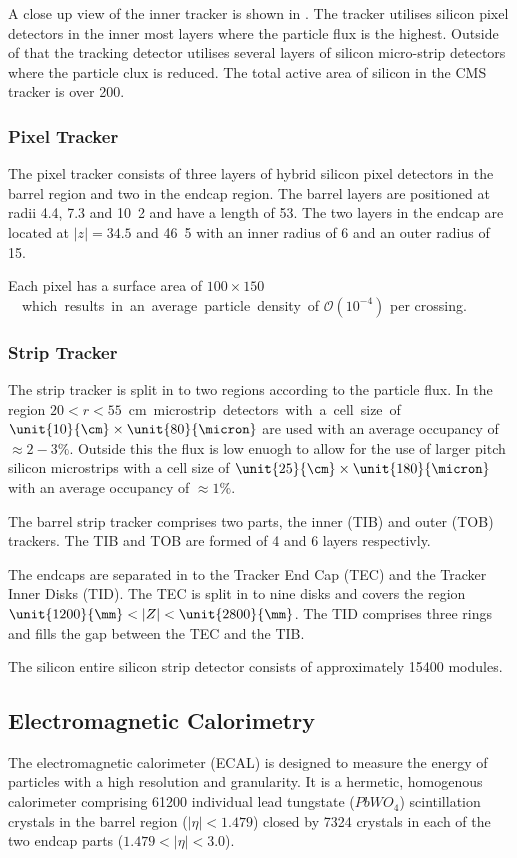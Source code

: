 A close up view of the inner tracker is shown in .
The tracker utilises silicon pixel detectors in the inner most layers where the
particle flux is the highest.
Outside of that the tracking detector utilises several layers of silicon
micro-strip detectors where the particle clux is reduced.
The total active area of silicon in the CMS tracker is over
\unit{200}{\meter\squared}.\cite{cms}

\subsubsection{Pixel Tracker}
The pixel tracker consists of three layers of hybrid silicon pixel detectors in
the barrel region and two in the endcap region. 
The barrel layers are positioned at radii 4.4, 7.3 and \unit{10.2}{\cm} and have
a length of \unit{53}{\cm}. The two layers in the endcap are located at
$|z|=34.5$ and \unit{46.5}{\cm} with an inner radius of \unit{6}{\cm} and an
outer radius of \unit{15}{\cm}.

Each pixel has a surface area of \unit{$100\times150$}{\micron} which results in
an average particle density of $\mathcal{O}(10^{-4})$ per crossing.

\subsubsection{Strip Tracker}
The strip tracker is split in to two regions according to the particle flux. In
the region \unit{$20<r<55$}{cm} microstrip detectors with a cell size of
$\unit{10}{\cm}\times\unit{80}{\micron}$ are used with an average occupancy of
$\approx\unit{2-3}{\%}$.
Outside this the flux is low enuogh to allow for the use of larger pitch silicon
microstrips with a cell size of $\unit{25}{\cm}\times\unit{180}{\micron}$ with
an average occupancy of $\approx\unit{1}{\%}$.

The barrel strip tracker comprises two parts, the inner (TIB) and outer (TOB)
trackers. The TIB and TOB are formed of 4 and 6 layers respectivly.

The endcaps are separated in to the Tracker End Cap (TEC) and the Tracker Inner
Disks (TID). The TEC is split in to nine disks and covers the region
$\unit{1200}{\mm} < |Z| < \unit{2800}{\mm}$. The TID comprises three rings
and fills the gap between the TEC and the TIB.

The silicon entire silicon strip detector consists of approximately 15400
modules.

\subsection{Electromagnetic Calorimetry}
The electromagnetic calorimeter (ECAL) is 
designed to measure the energy of
particles with a high resolution and granularity.
It is a hermetic, homogenous calorimeter comprising 61200 individual lead
tungstate ($PbWO_{4}$) scintillation crystals in the barrel region
($|\eta|<1.479$) closed by 7324 crystals in each of the two endcap parts
($1.479<|\eta|<3.0$).

